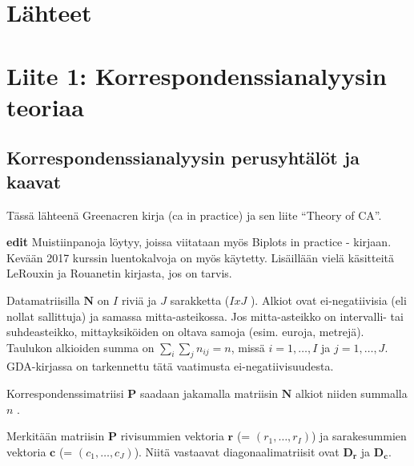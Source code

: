 \documentclass[
  finnish,
]{book}
\begin{document}
\hypertarget{luxe4hteet}{%
\chapter*{Lähteet}\label{luxe4hteet}}

\hypertarget{refs}{}

\hypertarget{appendix-liitteet}{%
\appendix}


\hypertarget{liite-1-korrespondenssianalyysin-teoriaa}{%
\chapter*{Liite 1: Korrespondenssianalyysin teoriaa}\label{liite-1-korrespondenssianalyysin-teoriaa}}

\hypertarget{korrespondenssianalyysin-perusyhtuxe4luxf6t-ja-kaavat}{%
\section*{Korrespondenssianalyysin perusyhtälöt ja kaavat}\label{korrespondenssianalyysin-perusyhtuxe4luxf6t-ja-kaavat}}

Tässä lähteenä Greenacren kirja\citep{RefWorks:doc:5a857a43e4b0ed2d44664d78} (ca in practice) ja sen liite
``Theory of CA''.

\textbf{edit} Muistiinpanoja löytyy, joissa viitataan myös Biplots in practice - kirjaan.
Kevään 2017 kurssin luentokalvoja on myös käytetty. Lisäillään vielä käsitteitä
LeRouxin ja Rouanetin kirjasta, jos on tarvis.

Datamatriisilla \(\boldsymbol{N}\) on \(I\) riviä ja \(J\) sarakketta (\(I x J\) ).
Alkiot ovat ei-negatiivisia (eli nollat sallittuja) ja samassa mitta-asteikossa.
Jos mitta-asteikko on intervalli- tai suhdeasteikko, mittayksiköiden on oltava
samoja (esim. euroja, metrejä). Taulukon alkioiden summa on
\(\sum_{i} \sum_{j}n_{ij} = n\), missä \(i = 1, \dots , I\) ja \(j = 1, \dots , J\).
GDA-kirjassa on tarkennettu tätä vaatimusta ei-negatiivisuudesta.

Korrespondenssimatriisi \(\boldsymbol{P}\) saadaan jakamalla matriisin
\(\boldsymbol{N}\) alkiot niiden summalla \(n\) .

Merkitään matriisin \(\boldsymbol{P}\) rivisummien vektoria
\(\boldsymbol{r}\) (= \((r_{1}, \dots, r_{I})\)) ja sarakesummien vektoria
\(\boldsymbol{c}\) (= \((c_{1}, \dots, c_{J})\)).
Niitä vastaavat diagonaalimatriisit ovat \(\boldsymbol{D_r}\) ja
\(\boldsymbol{D_c}\).
\end{document}
